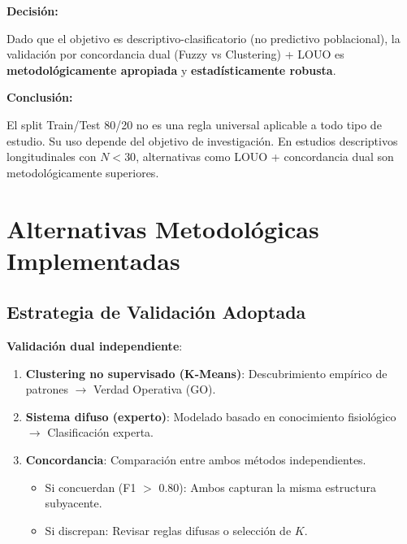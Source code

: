 \documentclass[12pt,letterpaper,twoside]{report}
\begin{document}
\begin{calculobox}
\begin{decisionbox}
\textbf{Decisión:}

Dado que el objetivo es descriptivo-clasificatorio (no predictivo poblacional), la validación por concordancia dual (Fuzzy vs Clustering) + LOUO es \textbf{metodológicamente apropiada} y \textbf{estadísticamente robusta}.
\end{decisionbox}

\begin{conclusionbox}
\textbf{Conclusión:}

El split Train/Test 80/20 no es una regla universal aplicable a todo tipo de estudio. Su uso depende del objetivo de investigación. En estudios descriptivos longitudinales con $N < 30$, alternativas como LOUO + concordancia dual son metodológicamente superiores.
\end{conclusionbox}

\section{Alternativas Metodológicas Implementadas}

\subsection{Estrategia de Validación Adoptada}

\begin{decisionbox}
\textbf{Validación dual independiente}:

\begin{enumerate}[noitemsep]
    \item \textbf{Clustering no supervisado (K-Means)}: Descubrimiento empírico de patrones $\to$ Verdad Operativa (GO).
    
    \item \textbf{Sistema difuso (experto)}: Modelado basado en conocimiento fisiológico $\to$ Clasificación experta.
    
    \item \textbf{Concordancia}: Comparación entre ambos métodos independientes.
    \begin{itemize}[noitemsep]
        \item Si concuerdan (F1 $>$ 0.80): Ambos capturan la misma estructura subyacente.
        \item Si discrepan: Revisar reglas difusas o selección de $K$.
    \end{itemize}
\end{enumerate}


\end{decisionbox}
\end{calculobox}
\end{document}
